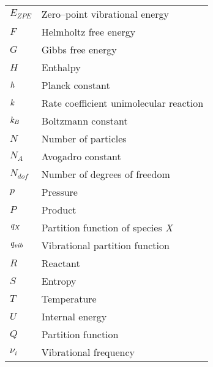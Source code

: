 \begin{longtable}{p{} p{}}
$ E_{ZPE}$ & Zero--point vibrational energy \\
$ F $ & Helmholtz free energy\\
$ G $ & Gibbs free energy\\
$ H $ & Enthalpy\\
$\it{h}$ & Planck constant\\
$ \it{k} $ & Rate coefficient unimolecular reaction\\ 
$ \it{k}_{B} $ & Boltzmann constant\\
$ N $ & Number of particles\\
$ N_{A} $ & Avogadro constant \\
$ N_{dof} $ & Number of degrees of freedom \\
$ p $ & Pressure\\
$ P $ & Product \\
$ \it{q_X} $ & Partition function of species \it{X}\\
$ \it{q_{vib}} $ & Vibrational partition function \\
$ R $ & Reactant \\
$ S $ & Entropy\\
$ T $ & Temperature \\
$ U $ & Internal energy\\
$ Q $ & Partition function\\
$\nu_{i}$ & Vibrational frequency \\ \hline
\end{longtable}

